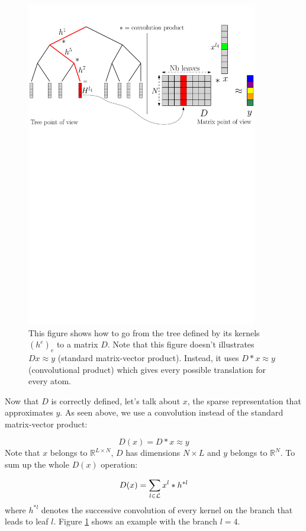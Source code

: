 \begin{figure}[!h] \centering
\includegraphics[width=0.9\textwidth]{figures/matrix-vs-tree.pdf} \caption{This figure shows how to go from the tree defined by its kernels $(h^e)_e$ to a matrix $D$. Note that this figure doesn't illustrates $Dx \approx y$ (standard matrix-vector product). Instead, it uses $D*x\approx y$ (convolutional product) which gives every possible translation for every atom.  \label{fig_matrix_vs_tree}}
\end{figure}
Now that $D$ is correctly defined, let's talk about $x$, the sparse representation that approximates $y$. As seen above, we use a convolution instead of the standard matrix-vector product:

$$D(x) = D*x \approx y$$
Note that $x$ belongs to $\mathbb{R}^{L\times N}$, $D$ has dimensions $N \times L$ and $y$ belongs to $\mathbb{R}^N$. To sum up the whole $D(x)$ operation:

$$
D(x) = \sum_{l \in \mathcal L} x^{l} * h^{*l}
$$
where $h^{*l}$ denotes the successive convolution of every kernel on the branch that leads to leaf $l$. Figure \ref{fig_matrix_vs_tree} shows an example with the branch $l=4$.

